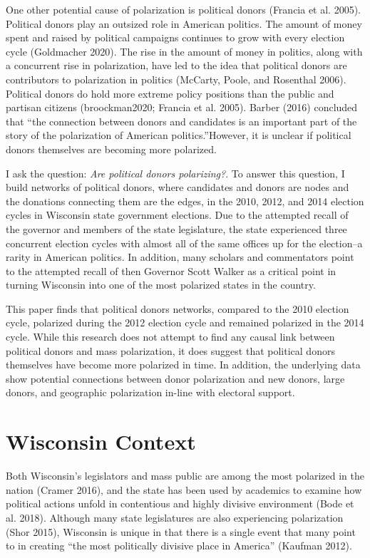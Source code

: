 \documentclass[12pt,]{article}
\begin{document}
One other potential cause of polarization is political donors (Francia
et al. 2005). Political donors play an outsized role in American
politics. The amount of money spent and raised by political campaigns
continues to grow with every election cycle (Goldmacher 2020). The rise
in the amount of money in politics, along with a concurrent rise in
polarization, have led to the idea that political donors are
contributors to polarization in politics (McCarty, Poole, and Rosenthal
2006). Political donors do hold more extreme policy positions than the
public and partisan citizens (broockman2020; Francia et al. 2005).
Barber (2016) concluded that ``the connection between donors and
candidates is an important part of the story of the polarization of
American politics.''However, it is unclear if political donors
themselves are becoming more polarized.

I ask the question: \emph{Are political donors polarizing?}. To answer
this question, I build networks of political donors, where candidates
and donors are nodes and the donations connecting them are the edges, in
the 2010, 2012, and 2014 election cycles in Wisconsin state government
elections. Due to the attempted recall of the governor and members of
the state legislature, the state experienced three concurrent election
cycles with almost all of the same offices up for the election--a rarity
in American politics. In addition, many scholars and commentators point
to the attempted recall of then Governor Scott Walker as a critical
point in turning Wisconsin into one of the most polarized states in the
country.

This paper finds that political donors networks, compared to the 2010
election cycle, polarized during the 2012 election cycle and remained
polarized in the 2014 cycle. While this research does not attempt to
find any causal link between political donors and mass polarization, it
does suggest that political donors themselves have become more polarized
in time. In addition, the underlying data show potential connections
between donor polarization and new donors, large donors, and geographic
polarization in-line with electoral support.

\hypertarget{wisconsin-context}{%
\section{Wisconsin Context}\label{wisconsin-context}}

Both Wisconsin's legislators and mass public are among the most
polarized in the nation (Cramer 2016), and the state has been used by
academics to examine how political actions unfold in contentious and
highly divisive environment (Bode et al. 2018). Although many state
legislatures are also experiencing polarization (Shor 2015), Wisconsin
is unique in that there is a single event that many point to in creating
``the most politically divisive place in America'' (Kaufman 2012).
\end{document}

